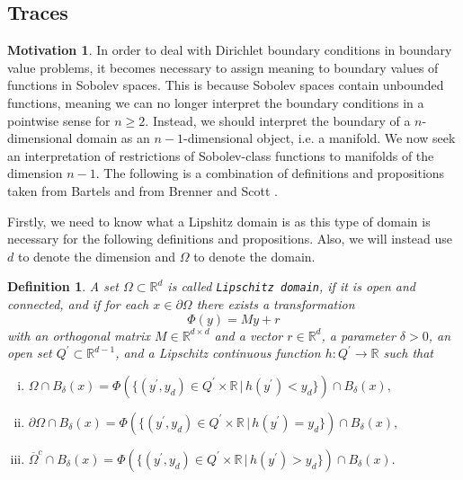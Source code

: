 \documentclass[11pt]{article}
\newtheorem{definition}{Definition}
\theoremstyle{definition}
\newtheorem*{motivation}{Motivation}
\begin{document}
\subsection{Traces}
\begin{motivation}
	In order to deal with Dirichlet boundary conditions in boundary value problems, it becomes necessary to assign meaning
	to boundary values of functions in Sobolev spaces. This is because Sobolev spaces contain unbounded functions,
	meaning we can no longer interpret the boundary conditions in a pointwise sense for $n \geq 2$.
	Instead, we should interpret the boundary of a $n$-dimensional domain as an $n-1$-dimensional object, i.e. a manifold.
	We now seek an interpretation of restrictions of Sobolev-class functions to manifolds of the dimension $n-1$.
	The following is a combination of definitions and propositions taken from Bartels \cite{bartels2016numerical} and from
	Brenner and Scott \cite{brenner2007mathematical}.
\end{motivation}
Firstly, we need to know what a Lipshitz domain is as this type of domain is necessary for the following definitions and propositions.
Also, we will instead use $d$ to denote the dimension and $\Omega$ to denote the domain.
\begin{definition}
	A set $\Omega \subset \mathbb{R}^d$ is called \texttt{Lipschitz domain}, if it is open and connected,
	and if for each $x \in \partial \Omega$ there exists a transformation
	\begin{equation*}
		\Phi(y) = My + r
	\end{equation*}
	with an orthogonal matrix $M \in \mathbb{R}^{d \times d}$ and a vector $r \in \mathbb{R}^d$,
	a parameter $\delta > 0$, an open set $Q^{\prime} \subset \mathbb{R}^{d-1}$, and a Lipschitz continuous function
	$h : Q^{\prime} \rightarrow \mathbb{R}$ such that
	\begin{enumerate}[(i)]
		\item $\Omega \cap B_{\delta}(x) = \Phi(\{(y^{\prime}, y_d) \in Q^{\prime} \times \mathbb{R} \, | \, h(y^{\prime}) < y_d\}) \cap B_{\delta}(x),$
		\item $\partial\Omega \cap B_{\delta}(x) = \Phi(\{(y^{\prime}, y_d) \in Q^{\prime} \times \mathbb{R} \, | \, h(y^{\prime}) = y_d\}) \cap B_{\delta}(x),$
		\item $\overline{\Omega}^c \cap B_{\delta}(x) = \Phi(\{(y^{\prime}, y_d) \in Q^{\prime} \times \mathbb{R} \, | \, h(y^{\prime}) > y_d\}) \cap B_{\delta}(x).$
	\end{enumerate}
\end{definition}
\end{document}
